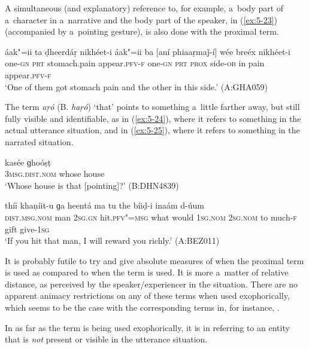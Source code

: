 A simultaneous (and explanatory) reference to, for example, a~body part of a~character in a~narrative and the body part of the speaker, in (\ref{ex:5-23}) (accompanied by a~pointing gesture), is also done with the proximal term.


\begin{exe}
\ex
\label{ex:5-23}
\gll áak"=ii ta ḍheerdáṛ nikhéet-i áak"=ii ba [aní phiaaṛmaǰ-í] wée
breéx nikhéet-i \\
one-\textsc{gn} \textsc{prt} stomach.pain appear.\textsc{pfv-f} one-\textsc{gn} \textsc{prt}
\textsc{prox} side-\textsc{ob} in pain appear.\textsc{pfv-f} \\
\glt `One of them got stomach pain and the other in this side.' (A:GHA059)
\end{exe}
The  term \textit{aṛó} (B. \textit{haṛó}) `that' points to something a~little farther away, but still fully visible and identifiable, as in (\ref{ex:5-24}), where it refers to something in the actual utterance situation, and in (\ref{ex:5-25}), where it refers to something in the narrated situation. 

\begin{exe}
\ex
\label{ex:5-24}
\gll [haṛó] kasée ɡhoóṣṭ \\
\textsc{3msg.dist.nom} whose house \\
\glt `Whose house is that [pointing]?' (B:DHN4839)

\ex
\label{ex:5-25}
 thíi khaṇíit-u ɡa heentá ma tu the bíiḍ-i inaám d-úum \\
\textsc{dist.msg.nom} man \textsc{2sg.gn} hit.\textsc{pfv"=msg} what would \textsc{1}\textsc{sg.nom} 
\textsc{2sg.nom} to much-\textsc{f} gift give-\textsc{1}\textsc{sg} \\
\glt `If you hit that man, I will reward you richly.' (A:BEZ011)
\end{exe}
It is probably futile to try and give absolute measures of when the proximal term is used as compared to when the  term is used. It is more a~matter of relative distance, as perceived by the speaker/experiencer in the situation. There are no apparent animacy restrictions on any of these terms when used exophorically, which seems to be the case with the corresponding terms in, for instance,   \citep[135]{schmidtkohistani2001}.

In as far as the  term is being used exophorically, it is in referring to an entity that is \textit{not} present or visible in the utterance situation. 


